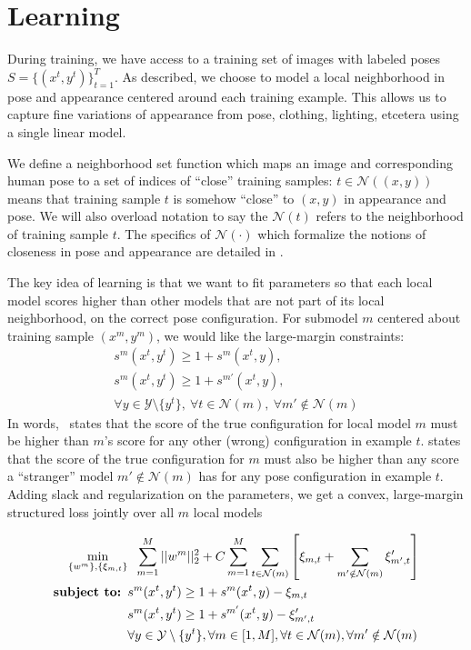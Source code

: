 \section{Learning}\label{sec:llps-learning}

During training, we have access to a training set of images with labeled poses 
$S = \{(x^{t},y^{t})\}_{t=1}^T$.  As described, we choose to model a local 
neighborhood in pose and appearance centered around each training example.  
This allows us to capture fine variations of appearance from pose, clothing, 
lighting, etcetera using a single linear model.

We define a neighborhood set function which maps an image and corresponding 
human pose to a set of indices of ``close'' training samples: $t \in 
\mathcal{N}((x,y))$ means that training sample $t$ is somehow ``close'' to 
$(x,y)$ in appearance and pose.  We will also overload notation to say the 
$\mathcal{N}(t)$ refers to the neighborhood of training sample $t$.  The 
specifics of $\mathcal{N}(\cdot)$ which formalize the notions of closeness in 
pose and appearance are detailed in .

The key idea of learning is that we want to fit parameters so that each local 
model scores higher than other models that are not part of its local 
neighborhood, on the correct pose configuration.  For submodel $m$ centered 
about training sample $(x^m,y^m)$, we would like the large-margin constraints:
\begin{align}
s^m(x^t,y^t) \geq 1 + s^{m}(x^t,y), \label{c1}\\
s^m(x^t,y^t) \geq 1 + s^{m'}(x^t,y),\label{c2}\\
\forall y \in \mathcal{Y}\setminus \{y^t\},~\forall t \in 
\mathcal{N}(m),~\forall m' \notin \mathcal{N}(m) \nonumber
\end{align}
In words,~ states that the score of the true configuration for local 
model $m$ must be higher than $m$'s score for any other (wrong) configuration 
in example $t$.   states that the score of the true configuration 
for $m$ must also be higher than any score a ``stranger'' model $m' \notin 
\mathcal{N}(m)$ has for any pose configuration in example $t$.  Adding slack 
and regularization on the parameters, we get a convex, large-margin structured 
loss jointly over all $m$ local models

\begin{align}\label{eq:full-learn}
\min_{\{w^m\}, \{\xi_{m,t}\}}& \;\; \sum_{m=1}^M ||w^m||_2^2 + C \sum_{m=1}^M 
\sum_{t \in \mathcal{N}(m)} \left[ \xi_{m,t} + \sum_{m' \notin \mathcal{N}(m)} 
\xi'_{m',t} \right] \\
\text{\bf{subject to:} }
&s^m(x^t,y^t) \geq 1 + s^{m}(x^t,y) - \xi_{m,t}\\
&s^m(x^t,y^t) \geq 1 + s^{m'}(x^t,y) - \xi'_{m',t}\\
&\forall y \in \mathcal{Y}\setminus \{y^t\}, \forall m \in [1,M], \forall t \in 
\mathcal{N}(m), \forall m' \notin \mathcal{N}(m) \nonumber \end{align}

